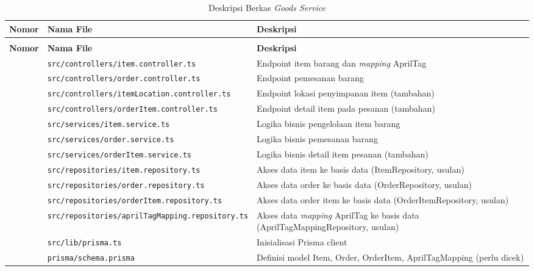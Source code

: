 \begin{xltabular}{\textwidth}{ | >{\raggedright\arraybackslash}p{1.5cm} | >{\raggedright\arraybackslash}p{6.5cm} | >{\raggedright\arraybackslash}X | }
    \caption{Deskripsi Berkas \textit{Goods Service}} \label{tab:file-goods} \\
    \hline
    \textbf{Nomor} & \textbf{Nama File} & \textbf{Deskripsi} \\
    \hline
    \endfirsthead
     \\
    \hline
    \textbf{Nomor} & \textbf{Nama File} & \textbf{Deskripsi} \\
    \hline
    \endhead
    \hline
     & \texttt{src/\allowbreak controllers/\allowbreak item.controller.ts} & Endpoint item barang dan \textit{mapping} AprilTag \\
     & \texttt{src/\allowbreak controllers/\allowbreak order.controller.ts} & Endpoint pemesanan barang \\
     & \texttt{src/\allowbreak controllers/\allowbreak itemLocation.controller.ts} & Endpoint lokasi penyimpanan item (tambahan) \\
     & \texttt{src/\allowbreak controllers/\allowbreak orderItem.controller.ts} & Endpoint detail item pada pesanan (tambahan) \\
     & \texttt{src/\allowbreak services/\allowbreak item.service.ts} & Logika bisnis pengelolaan item barang \\
     & \texttt{src/\allowbreak services/\allowbreak order.service.ts} & Logika bisnis pemesanan barang \\
     & \texttt{src/\allowbreak services/\allowbreak orderItem.service.ts} & Logika bisnis detail item pesanan (tambahan) \\
     & \texttt{src/\allowbreak repositories/\allowbreak item.repository.ts} & Akses data item ke basis data (ItemRepository, usulan) \\
     & \texttt{src/\allowbreak repositories/\allowbreak order.repository.ts} & Akses data order ke basis data (OrderRepository, usulan) \\
     & \texttt{src/\allowbreak repositories/\allowbreak orderItem.repository.ts} & Akses data order item ke basis data (OrderItemRepository, usulan) \\
     & \texttt{src/\allowbreak repositories/\allowbreak aprilTagMapping.repository.ts} & Akses data \textit{mapping} AprilTag ke basis data (AprilTagMappingRepository, usulan) \\
     & \texttt{src/\allowbreak lib/\allowbreak prisma.ts} & Inisialisasi Prisma client \\
     & \texttt{prisma/\allowbreak schema.prisma} & Definisi model Item, Order, OrderItem, AprilTagMapping (perlu dicek) \\
    \hline
\end{xltabular}

